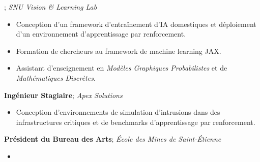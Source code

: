 \begin{rubric}{}
	\entry*[2022 -- 2024] %
	\textbf{}; \emph{SNU Vision \& Learning Lab}
	\begin{itemize}
		\item Conception d'un framework d'entraînement d'IA domestiques et déploiement d'un environnement d'apprentissage par renforcement.
		\item Formation de chercheurs au framework de machine learning JAX\@.
		\item Assistant d'enseignement en \emph{Modèles Graphiques Probabilistes} et de \emph{Mathématiques Discrètes}.
		      \itemizeVSpace{}
	\end{itemize}
	\textbf{Ingénieur Stagiaire}; \emph{Apex Solutions}
	\begin{itemize}
		\item Conception d'environnements de simulation d'intrusions dans des infrastructures critiques et de benchmarks d'apprentissage par renforcement.%
		      \itemizeVSpace{}
	\end{itemize}
	\entry*[2021 -- 2022] %
	\textbf{Président du Bureau des Arts}; \emph{École des Mines de Saint-Étienne}
	\begin{itemize}
		\item {}
		      \itemizeVSpace{}
	\end{itemize}
\end{rubric}
